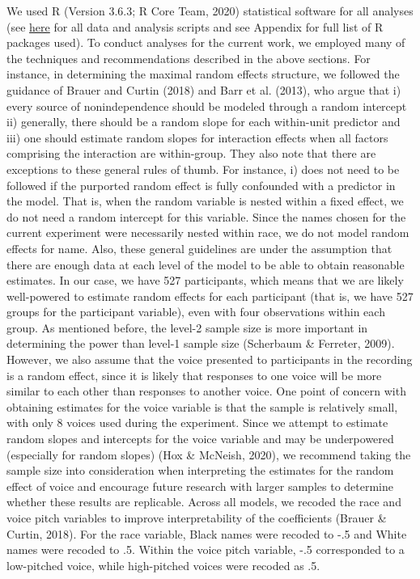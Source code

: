 \documentclass[
  english,
  man, noextraspace,floatsintext]{apa6}
\begin{document}
We used R (Version 3.6.3; R Core Team, 2020) statistical software for all analyses (see \href{https://github.com/keanarichards/stats-masters\%20--\%20make\%20sure\%20to\%20make\%20this\%20public}{here} for all data and analysis scripts and see Appendix for full list of R packages used). To conduct analyses for the current work, we employed many of the techniques and recommendations described in the above sections. For instance, in determining the maximal random effects structure, we followed the guidance of Brauer and Curtin (2018) and Barr et al. (2013), who argue that i) every source of nonindependence should be modeled through a random intercept ii) generally, there should be a random slope for each within-unit predictor and iii) one should estimate random slopes for interaction effects when all factors comprising the interaction are within-group. They also note that there are exceptions to these general rules of thumb. For instance, i) does not need to be followed if the purported random effect is fully confounded with a predictor in the model. That is, when the random variable is nested within a fixed effect, we do not need a random intercept for this variable. Since the names chosen for the current experiment were necessarily nested within race, we do not model random effects for name. Also, these general guidelines are under the assumption that there are enough data at each level of the model to be able to obtain reasonable estimates. In our case, we have 527 participants, which means that we are likely well-powered to estimate random effects for each participant (that is, we have 527 groups for the participant variable), even with four observations within each group. As mentioned before, the level-2 sample size is more important in determining the power than level-1 sample size (Scherbaum \& Ferreter, 2009). However, we also assume that the voice presented to participants in the recording is a random effect, since it is likely that responses to one voice will be more similar to each other than responses to another voice. One point of concern with obtaining estimates for the voice variable is that the sample is relatively small, with only 8 voices used during the experiment. Since we attempt to estimate random slopes and intercepts for the voice variable and may be underpowered (especially for random slopes) (Hox \& McNeish, 2020), we recommend taking the sample size into consideration when interpreting the estimates for the random effect of voice and encourage future research with larger samples to determine whether these results are replicable. Across all models, we recoded the race and voice pitch variables to improve interpretability of the coefficients (Brauer \& Curtin, 2018). For the race variable, Black names were recoded to -.5 and White names were recoded to .5. Within the voice pitch variable, -.5 corresponded to a low-pitched voice, while high-pitched voices were recoded as .5.
\end{document}
